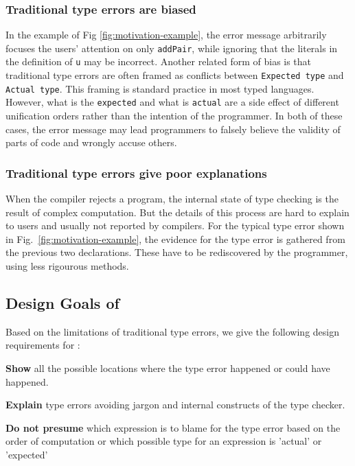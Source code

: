 \subsubsection{\textbf{Traditional type errors are biased}}
In the example of Fig \ref{fig:motivation-example}, the error message arbitrarily focuses the users' attention on only \texttt{addPair}, while ignoring that the literals in the definition of \texttt{u} may be incorrect. %
Another related form of bias is that traditional type errors are often framed as conflicts between \texttt{Expected type} and \texttt{Actual type}. This framing is standard practice in most typed languages. However, what is the \texttt{expected} and what is \texttt{actual} are a side effect of different unification orders rather than the intention of the programmer. In both of these cases, the error message may lead programmers to falsely believe the validity of parts of code and wrongly accuse others.

\subsubsection{\textbf{Traditional type errors give poor explanations}}
When the compiler rejects a program, the internal state of type checking is the result of complex computation. But the details of this process are hard to explain to users and usually not reported by compilers. For the typical type error shown in Fig.~\ref{fig:motivation-example}, the evidence for the type error is gathered from the previous two declarations. These have to be rediscovered by the programmer, using less rigourous methods. 

\subsection{Design Goals of \chameleon{}}
Based on the limitations of traditional type errors, we give the following design requirements for \chameleon{}:

\noindent\textbf{Show} all the possible locations where the type error happened or could have happened.

\noindent\textbf{Explain} type errors avoiding jargon and internal constructs of the type checker.

\noindent\textbf{Do not presume} which expression is to blame for the type error based on the order of computation or which possible type for an expression is 'actual' or 'expected'

